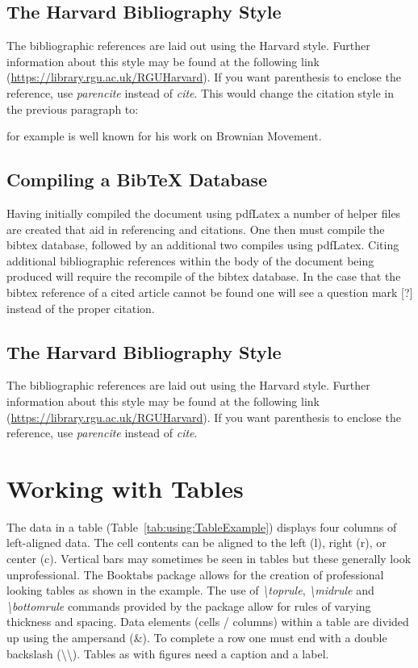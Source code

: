 \subsection{The Harvard Bibliography Style}

The bibliographic references are laid out using the Harvard style. Further information about this style may be found at the following link (\url{https://library.rgu.ac.uk/RGUHarvard}). If you want parenthesis to enclose the reference, use \textit{parencite} instead of \textit{cite}. This would change the citation style in the previous paragraph to:

\parencite{book:einsteinBrownianMovement} for example is well known for his work on Brownian Movement.

\subsection{Compiling a BibTeX Database}

Having initially compiled the document using pdfLatex a number of helper files are created that aid in referencing and citations. One then must compile the bibtex database, followed by an additional two compiles using pdfLatex. Citing additional bibliographic references within the body of the document being produced will require the recompile of the bibtex database. In the case that the bibtex reference of a cited article cannot be found one will see a question mark [?] instead of the proper citation.

\subsection{The Harvard Bibliography Style}

The bibliographic references are laid out using the Harvard style. Further information about this style may be found at the following link (\url{https://library.rgu.ac.uk/RGUHarvard}). If you want parenthesis to enclose the reference, use \textit{parencite} instead of \textit{cite}.


\section{Working with Tables}

The data in a table (Table~\ref{tab:using:TableExample}) displays four columns of left-aligned data. The cell contents can be aligned to the left (l), right (r), or center (c). Vertical bars may sometimes be seen in tables but these generally look unprofessional. The Booktabs package \cite{web:Fear2005BookTabs} allows for the creation of professional looking tables as shown in the example.  The use of \emph{\textbackslash toprule}, \emph{\textbackslash midrule} and \emph{\textbackslash bottomrule} commands provided by the package allow for rules of varying thickness and spacing. Data elements (cells / columns) within a table are divided up using the ampersand (\&). To complete a row one must end with a double backslash (\textbackslash\textbackslash). Tables as with figures need a caption and a label.


